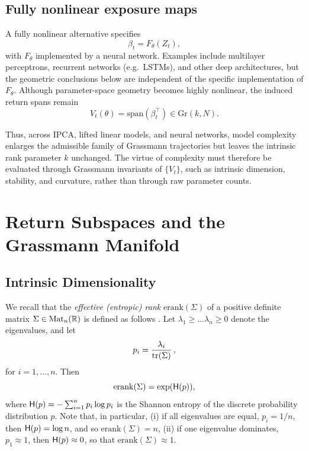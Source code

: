 \documentclass[twoside,11pt,letter]{article}
\begin{document}
\subsection{Fully nonlinear exposure maps}

A fully nonlinear alternative specifies
\begin{equation*}
\beta_t = F_\theta(Z_t),
\end{equation*}
with $F_\theta$ implemented by a neural network. Examples include multilayer perceptrons, recurrent networks (e.g.\ LSTMs), and other deep architectures, but the geometric conclusions below are independent of the specific implementation of $F_\theta$. Although parameter-space geometry becomes highly nonlinear, the induced return spans remain
\begin{equation*}
V_t(\theta) = \mathrm{span}(\beta_t^\top) \in \mathrm{Gr}(k,N).
\end{equation*}

Thus, across IPCA, lifted linear models, and neural networks, model complexity enlarges the admissible family of Grassmann trajectories but leaves the intrinsic rank parameter $k$ unchanged. The virtue of complexity must therefore be evaluated through Grassmann invariants of $\{V_t\}$, such as intrinsic dimension, stability, and curvature, rather than through raw parameter counts.


\section{Return Subspaces and the Grassmann Manifold}

\subsection{Intrinsic Dimensionality}

We recall that the \emph{effective (entropic) rank} $\mathrm{erank}(\Sigma)$ of a positive definite matrix $\Sigma\in\mathrm{Mat}_n(\mathbb{R})$ is defined as follows \cite{RV07}. Let $\lambda_1\geq\ldots\lambda_n\geq 0$ denote the eigenvalues, and let
\begin{equation*}
p_i = \frac{\lambda_i}{\mathrm{tr}(\Sigma)}\,,
\end{equation*}
for $i=1,\ldots,n$. Then
\begin{equation*}
\mathrm{erank}(\Sigma)=\exp(\mathsf{H}(p)),
\end{equation*}
where $\mathsf{H}(p)=-\sum_{i=1}^n p_i\log p_i$ is the Shannon entropy of the discrete probability distribution $p$. Note that, in particular, (i) if all eigenvalues are equal, $p_i=1/n$, then $\mathsf{H}(p)=\log n$, and so $\mathrm{erank}(\Sigma)=n$, (ii) if one eigenvalue dominates, $p_1\approx 1$, then $\mathsf{H}(p)\approx 0$, so that $\mathrm{erank}(\Sigma)\approx 1$. 
\end{document}

